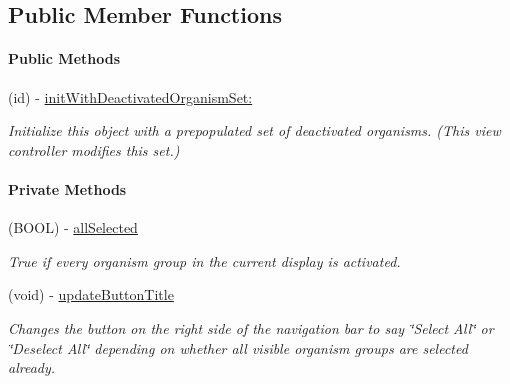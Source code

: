 \subsection*{Public Member Functions}
\begin{Indent}\paragraph*{Public Methods}
\begin{DoxyCompactItemize}
\item 
\hypertarget{interface_p_c_organism_hierarchy_table_view_controller_adbda81ccd26873dcaa9ac945d1d6ead5}{
(id) -\/ \hyperlink{interface_p_c_organism_hierarchy_table_view_controller_adbda81ccd26873dcaa9ac945d1d6ead5}{initWithDeactivatedOrganismSet:}}
\label{interface_p_c_organism_hierarchy_table_view_controller_adbda81ccd26873dcaa9ac945d1d6ead5}

\begin{DoxyCompactList}\small\item\em Initialize this object with a prepopulated set of deactivated organisms. (This view controller modifies this set.) \end{DoxyCompactList}\end{DoxyCompactItemize}
\end{Indent}
\begin{Indent}\paragraph*{Private Methods}
\begin{DoxyCompactItemize}
\item 
\hypertarget{interface_p_c_organism_hierarchy_table_view_controller_a8030d1024f7e84d55782aebc45af5879}{
(BOOL) -\/ \hyperlink{interface_p_c_organism_hierarchy_table_view_controller_a8030d1024f7e84d55782aebc45af5879}{allSelected}}
\label{interface_p_c_organism_hierarchy_table_view_controller_a8030d1024f7e84d55782aebc45af5879}

\begin{DoxyCompactList}\small\item\em True if every organism group in the current display is activated. \end{DoxyCompactList}\item 
\hypertarget{interface_p_c_organism_hierarchy_table_view_controller_a97f8c85ecee33ddd52ec3e802361c5f9}{
(void) -\/ \hyperlink{interface_p_c_organism_hierarchy_table_view_controller_a97f8c85ecee33ddd52ec3e802361c5f9}{updateButtonTitle}}
\label{interface_p_c_organism_hierarchy_table_view_controller_a97f8c85ecee33ddd52ec3e802361c5f9}

\begin{DoxyCompactList}\small\item\em Changes the button on the right side of the navigation bar to say \char`\"{}Select All\char`\"{} or \char`\"{}Deselect All\char`\"{} depending on whether all visible organism groups are selected already. \end{DoxyCompactList}\end{DoxyCompactItemize}
\end{Indent}
